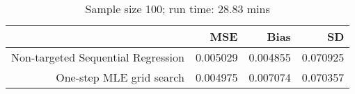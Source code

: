\begin{table}[ht]
\centering
\caption{Sample size 100; run time: 28.83 mins} 
\begin{tabular}{rrrr}
  \hline
 & MSE & Bias & SD \\ 
  \hline
Non-targeted Sequential Regression & 0.005029 & 0.004855 & 0.070925 \\ 
  One-step MLE grid search & 0.004975 & 0.007074 & 0.070357 \\ 
   \hline
\end{tabular}
\end{table}
